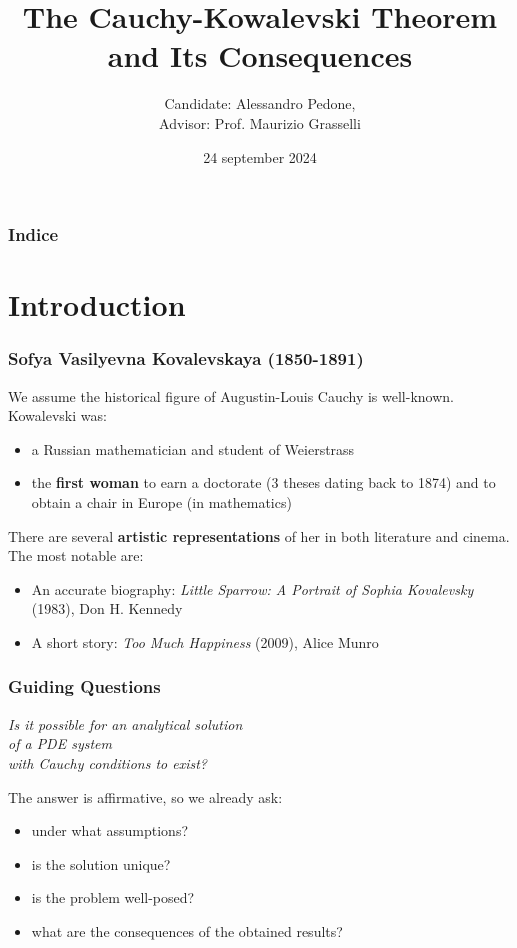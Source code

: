 \documentclass[serif,notheorems]{beamer}
\title{The Cauchy-Kowalevski Theorem\\ and Its Consequences }
\author{Candidate: Alessandro Pedone,\\ Advisor: Prof. Maurizio Grasselli }
\institute{Politecnico di Milano}
\date{24 september 2024}
\theoremstyle{definition} %
\theoremstyle{remark}
\begin{document}
\frame{\titlepage}
\begin{frame}
    \frametitle{Indice}
    \tableofcontents
\end{frame}


\section{Introduction}

\begin{frame}
\frametitle{Sofya Vasilyevna Kovalevskaya (1850-1891)}
We assume the historical figure of Augustin-Louis Cauchy is well-known. \\
Kowalevski was:
\begin{itemize}
\item a Russian mathematician and student of Weierstrass
\item the \textbf{first woman} to earn a doctorate (3 theses dating back to 1874) and to obtain a chair in Europe (in mathematics)
\end{itemize}
\end{frame}

\begin{frame}
There are several \textbf{artistic representations} of her in both literature and cinema. The most notable are:
\begin{itemize}
\item An accurate biography: \textit{Little Sparrow: A Portrait of Sophia Kovalevsky} (1983), Don H. Kennedy
\item A short story: \textit{Too Much Happiness} (2009), Alice Munro
\end{itemize}
\end{frame}


\begin{frame}
\frametitle{Guiding Questions}
\begin{center}
\textit{ Is it possible for an analytical solution \\ of a PDE system \\ with Cauchy conditions to exist?}
\end{center}
\end{frame}

\begin{frame}
The answer is affirmative, so we already ask:
\begin{itemize}
\item under what assumptions?
\item is the solution unique?
\item is the problem well-posed?
\item what are the consequences of the obtained results?
\end{itemize}
\end{frame}
\end{document}
